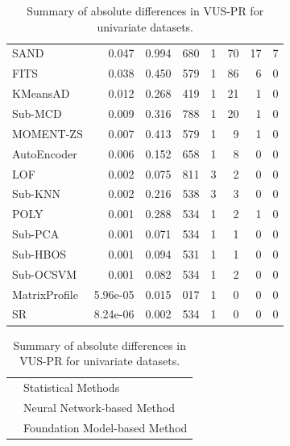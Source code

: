 \documentclass[12pt,oneside]{article}
\begin{document}
\begin{table}[htbp]
\begin{tabular}{lrrrrrrr}
        \rowcolor{lightgray} SAND & 0.047 & 0.994 & 680 & 1 & 70 & 17 & 7 \\
        \rowcolor{myLightBlue} FITS & 0.038 & 0.450 & 579 & 1 & 86 & 6 & 0 \\
        \rowcolor{lightgray} KMeansAD & 0.012 & 0.268 & 419 & 1 & 21 & 1 & 0 \\
        \rowcolor{lightgray} Sub-MCD & 0.009 & 0.316 & 788 & 1 & 20 & 1 & 0 \\
        \rowcolor{myLightGreen} MOMENT-ZS & 0.007 & 0.413 & 579 & 1 & 9 & 1 & 0 \\
        \rowcolor{myLightBlue} AutoEncoder & 0.006 & 0.152 & 658 & 1 & 8 & 0 & 0 \\
        \rowcolor{lightgray} LOF & 0.002 & 0.075 & 811 & 3 & 2 & 0 & 0 \\
        \rowcolor{lightgray} Sub-KNN & 0.002 & 0.216 & 538 & 3 & 3 & 0 & 0 \\
        \rowcolor{lightgray} POLY & 0.001 & 0.288 & 534 & 1 & 2 & 1 & 0 \\
        \rowcolor{lightgray} Sub-PCA & 0.001 & 0.071 & 534 & 1 & 1 & 0 & 0 \\
        \rowcolor{lightgray} Sub-HBOS & 0.001 & 0.094 & 531 & 1 & 1 & 0 & 0 \\
        \rowcolor{lightgray} Sub-OCSVM & 0.001 & 0.082 & 534 & 1 & 2 & 0 & 0 \\
        \rowcolor{lightgray} MatrixProfile & 5.96e-05 & 0.015 & 017 & 1 & 0 & 0 & 0 \\
        \rowcolor{lightgray} SR & 8.24e-06 & 0.002 & 534 & 1 & 0 & 0 & 0 \\
        \bottomrule
    \end{tabular}
    \par
    \vspace{1em}
    \noindent 
    \begin{tabular}{@{} p{1em} l @{}} 
        \rowcolor{lightgray} \strut & Statistical Methods \\
        \rowcolor{myLightBlue} \strut & Neural Network-based Method \\
        \rowcolor{myLightGreen} \strut & Foundation Model-based Method \\
        
    \end{tabular}
    \caption{\label{tab:Table 2} Summary of absolute differences in VUS-PR for univariate datasets.}
\end{table}
\end{document}
